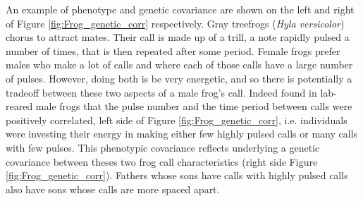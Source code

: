 An example of phenotype and genetic covariance are shown on the left
and right of Figure \ref{fig:Frog_genetic_corr} respectively. Gray
treefrogs ({\it Hyla versicolor}) chorus to attract mates. Their call
is made up of a trill, a note rapidly pulsed a number of times, that
is then repeated after some
period. Female frogs prefer males who make a lot of calls and where each
of those calls have a large number
of pulses. However, doing both is be very energetic, and so
there is potentially a tradeoff between these two aspects of a male frog's
call. Indeed \citet{welch2014multivariate} found
in lab-reared male frogs that the pulse number and the time period between
calls were positively correlated, left side of Figure \ref{fig:Frog_genetic_corr}, i.e. individuals were investing
their energy in making either few highly pulsed calls or many calls
with few pulses. This phenotypic covariance reflects underlying a
genetic covariance between theses two frog call
characteristics (right side  Figure \ref{fig:Frog_genetic_corr}). Fathers whose sons have calls with highly pulsed
calls also have sons whose calls are more spaced apart.

